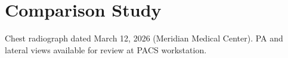\section{Comparison Study}

Chest radiograph dated March 12, 2026 (Meridian Medical Center). PA and lateral views available for review at PACS workstation.
